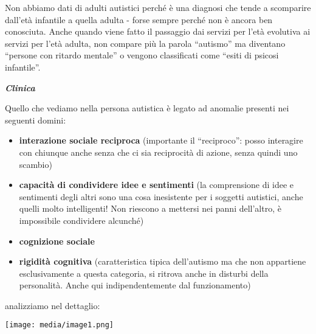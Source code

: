 \documentclass[]{article}
\begin{document}
Non abbiamo dati di adulti autistici perché è una diagnosi che tende a
scomparire dall'età infantile a quella adulta - forse sempre perché non
è ancora ben conosciuta. Anche quando viene fatto il passaggio dai
servizi per l'età evolutiva ai servizi per l'età adulta, non compare più
la parola ``autismo'' ma diventano ``persone con ritardo mentale'' o
vengono classificati come ``esiti di psicosi infantile''.

\emph{\textbf{Clinica}}

Quello che vediamo nella persona autistica è legato ad anomalie presenti
nei seguenti domini:

\begin{itemize}
\item
  \textbf{interazione sociale reciproca} (importante il ``reciproco'':
  posso interagire con chiunque anche senza che ci sia reciprocità di
  azione, senza quindi uno scambio)
\item
  \textbf{capacità di condividere idee e sentimenti} (la comprensione di
  idee e sentimenti degli altri sono una cosa inesistente per i soggetti
  autistici, anche quelli molto intelligenti! Non riescono a mettersi
  nei panni dell'altro, è impossibile condividere alcunché)
\item
  \textbf{cognizione sociale}
\item
  \textbf{rigidità cognitiva} (caratteristica tipica dell'autismo ma che
  non appartiene esclusivamente a questa categoria, si ritrova anche in
  disturbi della personalità. Anche qui indipendentemente dal
  funzionamento)
\end{itemize}

analizziamo nel dettaglio:

\texttt{[image: media/image1.png]}
\end{document}
